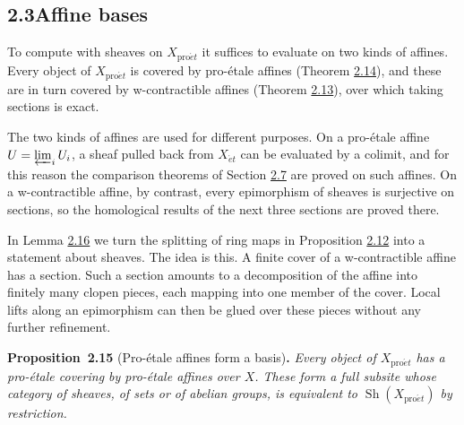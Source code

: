 \documentclass[11pt]{article}
\newenvironment{bpstatement}[2]{\par\addvspace{0.6\baselineskip}\noindent\textbf{#1}#2\textbf{.}\enspace\ignorespaces}
  {\par\addvspace{0.4\baselineskip}}
\newenvironment{bpstatementit}[2]{\begin{bpstatement}{#1}{#2}\itshape\ignorespaces}{\end{bpstatement}}
\providecommand{\Sh}{}\renewcommand{\Sh}{\operatorname{Sh}}
\begin{document}
\subsection*{\texorpdfstring{2.3\quad Affine bases}{2.3 Affine bases}}
\label{bp42}%
\label{bp43}%
To compute with sheaves on \(X_{\mathrm{pro}\acute{e}t}\) it suffices to evaluate on two kinds of affines. Every object of \(X_{\mathrm{pro}\acute{e}t}\) is covered by pro-étale affines (Theorem \hyperref[bp40]{2.14}), and these are in turn covered by w-contractible affines (Theorem \hyperref[bp37]{2.13}), over which taking sections is exact.

The two kinds of affines are used for different purposes. On a pro-étale affine \(U=\varprojlim_iU_i\), a sheaf pulled back from \(X_{\acute{e}t}\) can be evaluated by a colimit, and for this reason the comparison theorems of Section \hyperref[bp87]{2.7} are proved on such affines. On a w-contractible affine, by contrast, every epimorphism of sheaves is surjective on sections, so the homological results of the next three sections are proved there.

In Lemma \hyperref[bp47]{2.16} we turn the splitting of ring maps in Proposition \hyperref[bp34]{2.12} into a statement about sheaves. The idea is this. A finite cover of a w-contractible affine has a section. Such a section amounts to a decomposition of the affine into finitely many clopen pieces, each mapping into one member of the cover. Local lifts along an epimorphism can then be glued over these pieces without any further refinement.

\label{bp44}%
\begin{bpstatementit}{Proposition~2.15}{ (Pro-étale affines form a basis)}
Every object of \(X_{\mathrm{pro}\acute{e}t}\) has a pro-étale covering by pro-étale affines over \(X\). These form a full subsite whose category of sheaves, of sets or of abelian groups, is equivalent to \(\Sh(X_{\mathrm{pro}\acute{e}t})\) by restriction.
\end{bpstatementit}
\end{document}
